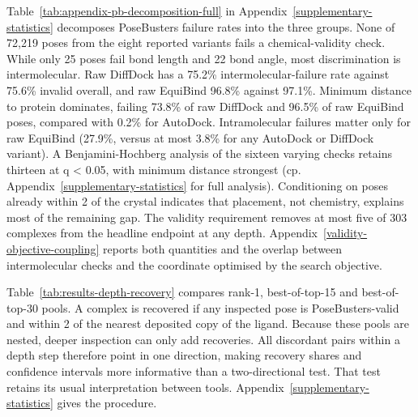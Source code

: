 Table~\ref{tab:appendix-pb-decomposition-full} in Appendix~\ref{supplementary-statistics} decomposes PoseBusters failure rates into the three groups. None of 72,219 poses from the eight reported variants fails a chemical-validity check. While only 25 poses fail bond length and 22 bond angle, most discrimination is intermolecular. Raw DiffDock has a 75.2\% intermolecular-failure rate against 75.6\% invalid overall, and raw EquiBind 96.8\% against 97.1\%. Minimum distance to protein dominates, failing 73.8\% of raw DiffDock and 96.5\% of raw EquiBind poses, compared with 0.2\% for AutoDock. Intramolecular failures matter only for raw EquiBind (27.9\%, versus at most 3.8\% for any AutoDock or DiffDock variant). A Benjamini-Hochberg analysis of the sixteen varying checks retains thirteen at q \textless{} 0.05, with minimum distance strongest (cp. Appendix~\ref{supplementary-statistics} for full analysis). Conditioning on poses already within 2\angstrom{} of the crystal indicates that placement, not chemistry, explains most of the remaining gap. The validity requirement removes at most five of 303 complexes from the headline endpoint at any depth. Appendix~\ref{validity-objective-coupling} reports both quantities and the overlap between intermolecular checks and the coordinate optimised by the search objective.

Table~\ref{tab:results-depth-recovery} compares rank-1, best-of-top-15 and best-of-top-30 pools. A complex is recovered if any inspected pose is PoseBusters-valid and within 2\angstrom{} of the nearest deposited copy of the ligand. Because these pools are nested, deeper inspection can only add recoveries. All discordant pairs within a depth step therefore point in one direction, making recovery shares and confidence intervals more informative than a two-directional test. That test retains its usual interpretation between tools. Appendix~\ref{supplementary-statistics} gives the procedure.

